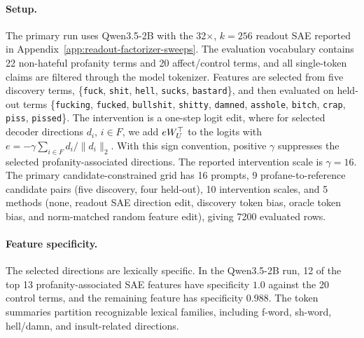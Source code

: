 \paragraph{Setup.}
The primary run uses Qwen3.5-2B with the 32$\times$, $k=256$ readout SAE
reported in Appendix~\ref{app:readout-factorizer-sweeps}. The evaluation vocabulary
contains 22 non-hateful profanity terms and 20 affect/control terms, and all
single-token claims are filtered through the model tokenizer. Features are
selected from five discovery terms, \{\texttt{fuck}, \texttt{shit},
\texttt{hell}, \texttt{sucks}, \texttt{bastard}\}, and then evaluated on held-out
terms \{\texttt{fucking}, \texttt{fucked}, \texttt{bullshit}, \texttt{shitty},
\texttt{damned}, \texttt{asshole}, \texttt{bitch}, \texttt{crap},
\texttt{piss}, \texttt{pissed}\}. The intervention is a one-step logit edit, where
for selected decoder directions \(d_i\), \(i\in F\), we add
\(eW_U^\top\) to the logits with
\(e=-\gamma\sum_{i\in F} d_i/\|d_i\|_2\). With this sign convention, positive
\(\gamma\) suppresses the selected profanity-associated directions. The reported
intervention scale is \(\gamma=16\). The primary candidate-constrained grid has
16 prompts, 9 profane-to-reference candidate pairs (five discovery, four
held-out), 10 intervention scales, and 5 methods
(none, readout SAE direction edit, discovery token bias, oracle token bias, and
norm-matched random feature edit), giving 7200 evaluated rows.

\paragraph{Feature specificity.}
The selected directions are lexically specific. In the Qwen3.5-2B run, 12 of
the top 13 profanity-associated SAE features have
specificity \(1.0\) against the 20 control terms, and the remaining feature has
specificity \(0.988\). The token summaries partition recognizable lexical
families, including f-word, sh-word, hell/damn, and insult-related directions.

